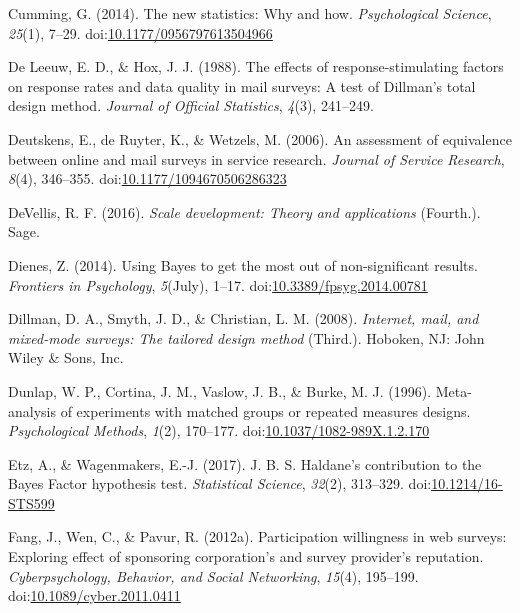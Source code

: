\documentclass[english,man]{apa6}
\theoremstyle{definition}
\theoremstyle{definition}
\theoremstyle{definition}
\theoremstyle{remark}
\begin{document}
\hypertarget{ref-Cumming2014}{}
Cumming, G. (2014). The new statistics: Why and how. \emph{Psychological
Science}, \emph{25}(1), 7--29.
doi:\href{https://doi.org/10.1177/0956797613504966}{10.1177/0956797613504966}

\hypertarget{ref-DeLeeuw1988}{}
De Leeuw, E. D., \& Hox, J. J. (1988). The effects of
response-stimulating factors on response rates and data quality in mail
surveys: A test of Dillman's total design method. \emph{Journal of
Official Statistics}, \emph{4}(3), 241--249.

\hypertarget{ref-Deutskens2006}{}
Deutskens, E., de Ruyter, K., \& Wetzels, M. (2006). An assessment of
equivalence between online and mail surveys in service research.
\emph{Journal of Service Research}, \emph{8}(4), 346--355.
doi:\href{https://doi.org/10.1177/1094670506286323}{10.1177/1094670506286323}

\hypertarget{ref-DeVellis2016a}{}
DeVellis, R. F. (2016). \emph{Scale development: Theory and
applications} (Fourth.). Sage.

\hypertarget{ref-Dienes2014}{}
Dienes, Z. (2014). Using Bayes to get the most out of non-significant
results. \emph{Frontiers in Psychology}, \emph{5}(July), 1--17.
doi:\href{https://doi.org/10.3389/fpsyg.2014.00781}{10.3389/fpsyg.2014.00781}

\hypertarget{ref-Dillman2008}{}
Dillman, D. A., Smyth, J. D., \& Christian, L. M. (2008).
\emph{Internet, mail, and mixed-mode surveys: The tailored design
method} (Third.). Hoboken, NJ: John Wiley \& Sons, Inc.

\hypertarget{ref-Dunlap1996a}{}
Dunlap, W. P., Cortina, J. M., Vaslow, J. B., \& Burke, M. J. (1996).
Meta-analysis of experiments with matched groups or repeated measures
designs. \emph{Psychological Methods}, \emph{1}(2), 170--177.
doi:\href{https://doi.org/10.1037/1082-989X.1.2.170}{10.1037/1082-989X.1.2.170}

\hypertarget{ref-Etz2015}{}
Etz, A., \& Wagenmakers, E.-J. (2017). J. B. S. Haldane's contribution
to the Bayes Factor hypothesis test. \emph{Statistical Science},
\emph{32}(2), 313--329.
doi:\href{https://doi.org/10.1214/16-STS599}{10.1214/16-STS599}

\hypertarget{ref-Fang2012a}{}
Fang, J., Wen, C., \& Pavur, R. (2012a). Participation willingness in
web surveys: Exploring effect of sponsoring corporation's and survey
provider's reputation. \emph{Cyberpsychology, Behavior, and Social
Networking}, \emph{15}(4), 195--199.
doi:\href{https://doi.org/10.1089/cyber.2011.0411}{10.1089/cyber.2011.0411}
\end{document}
